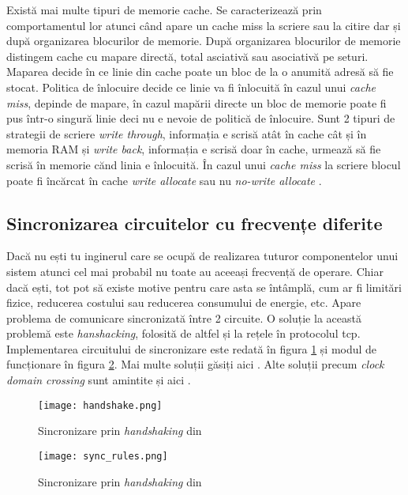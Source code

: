 \documentclass[../main.tex]{subfiles}
\begin{document}
Există mai multe tipuri de memorie cache. Se caracterizează prin comportamentul lor atunci când apare un cache miss la scriere
sau la citire dar și după organizarea blocurilor de memorie. După organizarea blocurilor de memorie distingem cache cu
mapare directă, total asciativă sau asociativă pe seturi. Maparea decide în ce linie din cache poate un bloc de la o anumită 
adresă să fie stocat. Politica de înlocuire decide ce linie va fi înlocuită în cazul unui \emph{cache miss}, depinde de
mapare, în cazul mapării directe un bloc de memorie poate fi pus într-o singură linie deci nu e nevoie de politică de
înlocuire. Sunt 2 tipuri de strategii de scriere \emph{write through}, informația e scrisă atât în cache cât și în memoria RAM
și \emph{write back}, informația e scrisă doar în cache, urmează să fie scrisă în memorie cănd linia e înlocuită. În cazul unui
\emph{cache miss} la scriere blocul poate fi încărcat în cache \emph{write allocate} sau nu \emph{no-write allocate}
\cite{cache}.

\subsection{Sincronizarea circuitelor cu frecvențe diferite}
Dacă nu ești tu inginerul care se ocupă de realizarea tuturor componentelor unui sistem atunci cel mai probabil nu toate
au aceeași frecvență de operare. Chiar dacă ești, tot pot să existe motive pentru care asta se întâmplă, cum ar fi
limitări fizice, reducerea costului sau reducerea consumului de energie, etc. Apare problema de comunicare sincronizată
între 2 circuite. O soluție la această problemă este \emph{hanshacking}, folosită de altfel și la rețele în protocolul
\acrshort{tcp}. Implementarea circuitului de sincronizare este redată în figura \ref{fig:handshake} și modul de funcționare
în figura \ref{fig:handshake_rules}. Mai multe soluții găsiți aici \cite{sync}.
Alte soluții precum \emph{clock domain crossing} sunt amintite și aici \cite{block_memory}.

\begin{figure}[h]
    \centering
    \texttt{[image: handshake.png]}
    \caption{Sincronizare prin \emph{handshaking} din \cite{sync}}
    \label{fig:handshake}
\end{figure}

\begin{figure}[h]
    \centering
    \texttt{[image: sync\_rules.png]}
    \caption{Sincronizare prin \emph{handshaking} din \cite{sync}}
    \label{fig:handshake_rules}
\end{figure}
\end{document}
